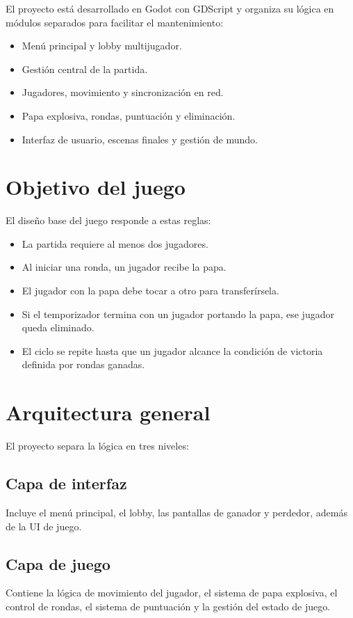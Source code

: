 \documentclass[11pt,a4paper]{article}
\begin{document}
El proyecto está desarrollado en Godot con GDScript y organiza su lógica en módulos separados para facilitar el mantenimiento:
\begin{itemize}[nosep]
    \item Menú principal y lobby multijugador.
    \item Gestión central de la partida.
    \item Jugadores, movimiento y sincronización en red.
    \item Papa explosiva, rondas, puntuación y eliminación.
    \item Interfaz de usuario, escenas finales y gestión de mundo.
\end{itemize}

\section{Objetivo del juego}
El diseño base del juego responde a estas reglas:
\begin{itemize}[nosep]
    \item La partida requiere al menos dos jugadores.
    \item Al iniciar una ronda, un jugador recibe la papa.
    \item El jugador con la papa debe tocar a otro para transferírsela.
    \item Si el temporizador termina con un jugador portando la papa, ese jugador queda eliminado.
    \item El ciclo se repite hasta que un jugador alcance la condición de victoria definida por rondas ganadas.
\end{itemize}

\section{Arquitectura general}
El proyecto separa la lógica en tres niveles:

\subsection{Capa de interfaz}
Incluye el menú principal, el lobby, las pantallas de ganador y perdedor, además de la UI de juego.

\subsection{Capa de juego}
Contiene la lógica de movimiento del jugador, el sistema de papa explosiva, el control de rondas, el sistema de puntuación y la gestión del estado de juego.
\end{document}
